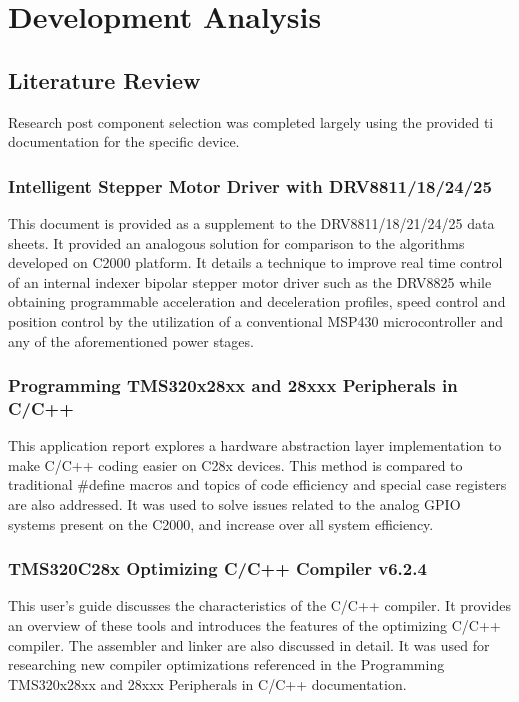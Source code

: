 \chapter{Development Analysis}
\section{Literature Review}
Research post component selection was completed largely using the provided \gls{ti} documentation for the specific device.
\subsection{Intelligent Stepper Motor Driver with DRV8811/18/24/25}
This document is provided as a supplement to the DRV8811/18/21/24/25 data sheets. 
It provided an analogous solution for comparison to the algorithms developed on C2000 platform.
It details a technique to improve real time control of an internal indexer bipolar stepper motor driver such as the DRV8825 while obtaining programmable acceleration and deceleration profiles, speed control and position control by the utilization of a conventional MSP430 microcontroller and any of the aforementioned power stages.\cite{dev_intelligent}

\subsection{Programming TMS320x28xx and 28xxx Peripherals in C/C++}
This application report explores a hardware abstraction layer implementation to make C/C++ coding easier on C28x devices. 
This method is compared to traditional \#define macros and topics of code efficiency and special case registers are also addressed.\cite{dev_peripherals}
It was used to solve issues related to the analog GPIO systems present on the C2000, and increase over all system efficiency.

\subsection{TMS320C28x Optimizing C/C++ Compiler v6.2.4}
This user's guide discusses the characteristics of the C/C++ compiler.
It provides an overview of these tools and introduces the features of the optimizing C/C++ compiler. 
The assembler and linker are also discussed in detail.\cite{dev_optimize}
It was used for researching new compiler optimizations referenced in the Programming TMS320x28xx and 28xxx Peripherals in C/C++ documentation.

